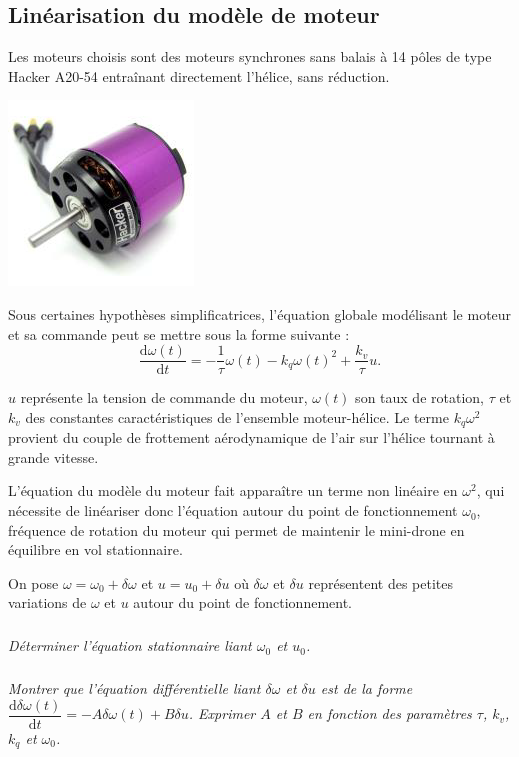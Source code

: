 \documentclass[10pt,fleqn]{article} %
\begin{document}
\begin{multicols}{2}
\section*{Linéarisation du modèle de moteur}
Les moteurs choisis sont des moteurs synchrones sans balais à 14 pôles de type Hacker A20-54 entraînant
directement l'hélice, sans réduction.

\begin{center}
\includegraphics[width=.4\linewidth]{images/fig_03}
\end{center}

Sous certaines hypothèses simplificatrices, l'équation globale modélisant le moteur et sa commande peut se
mettre sous la forme suivante :
$$
\dfrac{\text{d}\omega(t)}{\text{d}t}=-\dfrac{1}{\tau}\omega(t) -k_q\omega(t)^2 + \dfrac{k_v}{\tau}u.
$$

$u$ représente la tension de commande du moteur, $\omega(t)$ son taux de rotation, $\tau$ et $k_v$ des constantes caractéristiques de l'ensemble moteur-hélice. Le terme $k_q\omega^2$ provient du couple de frottement aérodynamique de l'air sur l'hélice tournant à grande vitesse.

L'équation du modèle du moteur fait apparaître un terme non linéaire en $\omega^2$, qui nécessite de linéariser
donc l'équation autour du point de fonctionnement $\omega_0$, fréquence de rotation du moteur qui permet de
maintenir le mini-drone en équilibre en vol stationnaire.

On pose $\omega=\omega_0+\delta \omega$ et $u=u_0+\delta u$ où $\delta\omega$ et $\delta u$ représentent des petites variations de $\omega$ et $u$ autour du point de fonctionnement.

\subparagraph{}\textit{Déterminer l’équation stationnaire liant $\omega_0$ et $u_0$.}

\subparagraph{}\textit{Montrer que l'équation différentielle liant $\delta \omega$ et $\delta u$ est de la forme $\dfrac{\text{d}\delta \omega(t) }{\text{d}t}=-A\delta \omega(t) + B \delta u$. Exprimer $A$ et $B$ en fonction des paramètres $\tau$, $k_v$, $k_q$ et $\omega_0$.}


\end{multicols}
\end{document}
